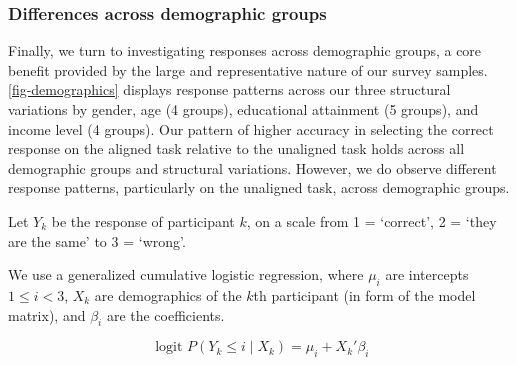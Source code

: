 \documentclass[
]{jds}
\begin{document}
\hypertarget{differences-across-demographic-groups}{%
\subsubsection{Differences across demographic
groups}\label{differences-across-demographic-groups}}

Finally, we turn to investigating responses across demographic groups, a
core benefit provided by the large and representative nature of our
survey samples. \autoref{fig-demographics} displays response patterns
across our three structural variations by gender, age (4 groups),
educational attainment (5 groups), and income level (4 groups). Our
pattern of higher accuracy in selecting the correct response on the
aligned task relative to the unaligned task holds across all demographic
groups and structural variations. However, we do observe different
response patterns, particularly on the unaligned task, across
demographic groups.

Let \(Y_k\) be the response of participant \(k\), on a scale from 1 =
`correct', 2 = `they are the same' to 3 = `wrong'.

We use a generalized cumulative logistic regression, where \(\mu_i\) are
intercepts \(1 \le i < 3\), \(X_k\) are demographics of the \(k\)th
participant (in form of the model matrix), and \(\beta_{i}\) are the
coefficients.

\begin{equation}
\text{ logit } P(Y_k \le i \mid X_k) = \mu_i + X_{k}'\beta_{i}
\end{equation}
\end{document}
